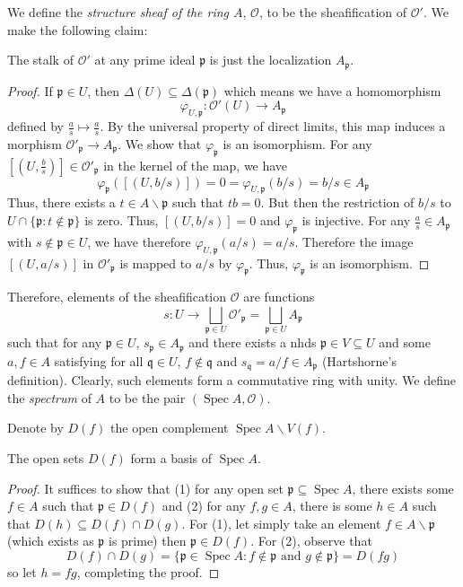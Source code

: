 \documentclass[12pt,letter]{article}
\newcommand{\D}[0]{\Delta}
\newcommand{\Spec}[0]{\operatorname{Spec}}
\begin{document}
	We define the \textit{structure sheaf of the ring $A$}, $\mathscr O$, to be the sheafification of $\mathscr O'$. We make the following claim:
	\begin{lemma}\label{l211}
	The stalk of $\mathscr O'$ at any prime ideal $\mathfrak p$ is just the localization $A_{\mathfrak p}$.
	\end{lemma}
	\begin{proof}
	If $\mathfrak p\in U$, then $\D(U)\subseteq \D(\mathfrak p)$ which means we have a homomorphism
	\[\varphi_{U,\mathfrak p}:\mathscr O'(U)\to A_{\mathfrak p}\]
	defined by $\frac{a}{s}\mapsto \frac{a}{s}$. By the universal property of direct limits, this map induces a morphism $\mathscr O'_{\mathfrak p}\to A_{\mathfrak p}$. We show that $\varphi_{\mathfrak p}$ is an isomorphism. For any $[(U, \frac{b}{s})]\in \mathscr O'_{\mathfrak p}$ in the kernel of the map, we have
	\[\varphi_{\mathfrak p}([(U, b/s)])=0=\varphi_{U,\mathfrak p}(b/s)=b/s\in A_{\mathfrak p}\]
	Thus, there exists a $t\in A\backslash \mathfrak p$ such that $tb=0$. But then the restriction of $b/s$ to $U\cap \{\mathfrak p:t\notin \mathfrak p\}$ is zero. Thus, $[(U, b/s)]=0$ and $\varphi_{\mathfrak p}$ is injective. For any $\frac{a}{s}\in A_{\mathfrak p}$ with $s\notin \mathfrak p\in U$, we have therefore $\varphi_{U, \mathfrak p}(a/ s)=a/s$. Therefore the image $[(U, a/s)]$ in $\mathscr O'_{\mathfrak p}$ is mapped to $a/s$ by $\varphi_{\mathfrak p}$. Thus, $\varphi_{\mathfrak p}$ is an isomorphism.
	\end{proof}
	
	Therefore, elements of the sheafification $\mathscr O$ are functions 
	\[s:U\to \bigsqcup_{\mathfrak p\in U} \mathscr O'_{\mathfrak p}=\bigsqcup_{\mathfrak p\in U} A_{\mathfrak p}\]
	such that for any $\mathfrak p\in U$, $s_{\mathfrak p}\in A_{\mathfrak p}$ and there exists a nhds $\mathfrak p\in V\subseteq U$ and some $a, f\in A$ satisfying for all $\mathfrak q\in U$, $f\notin \mathfrak q$ and $s_{\mathfrak q}= a/f\in A_{\mathfrak p}$ (Hartshorne's definition). Clearly, such elements form a commutative ring with unity. We define the \textit{spectrum} of $A$ to be the pair $(\Spec A, \mathscr O)$. 
	
	Denote by $D(f)$ the open complement $\Spec A\backslash V(f)$.
	\begin{lemma}\label{l212}
	The open sets $D(f)$ form a basis of $\Spec A$.
	\end{lemma}
	\begin{proof}
	It suffices to show that (1) for any open set $\mathfrak p\subseteq \Spec A$, there exists some $f\in A$ such that $\mathfrak p \in D(f)$ and (2) for any $f, g\in A$, there is some $h\in A$ such that $D(h)\subseteq D(f)\cap D(g)$. For (1), let simply take an element $f\in A\backslash\mathfrak p$ (which exists as $\mathfrak p$ is prime) then $\mathfrak p\in D(f)$. For (2), observe that 
	\[D(f)\cap D(g)=\{\mathfrak p\in\Spec A: f\notin \mathfrak p\text{ and }g\notin \mathfrak p\}=D(fg)\]
	so let $h=fg$, completing the proof.
	\end{proof}
	
\end{document}
